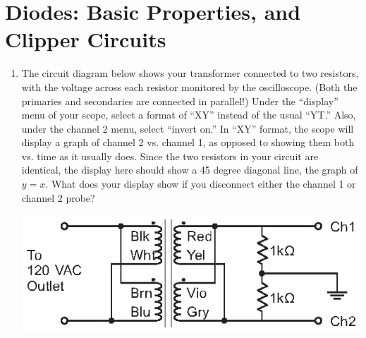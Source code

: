 \section{Diodes: Basic Properties, and Clipper Circuits}
\label{lab_diodes}


\bigskip

\begin{enumerate}[wide]

\item The circuit diagram below shows your transformer connected to two resistors, with the voltage across each resistor monitored by the oscilloscope.  (Both the primaries and secondaries are connected in parallel!)  Under the ``display'' menu of your scope, select a format of ``XY'' instead of the usual ``YT.''  Also, under the channel 2 menu, select ``invert on.'' In ``XY'' format, the scope will display a graph of channel 2 vs. channel 1, as opposed to showing them both vs. time as it usually does.  Since the two resistors in your circuit are identical, the display here should show a 45 degree diagonal line, the graph of $y = x$.  What does your display show if you disconnect either the channel 1 or channel 2 probe?
\vspace{-0.1in}
\begin{center}
\includegraphics{diodes/diode_testing_circuit_1.eps}
\end{center}


\end{enumerate}
